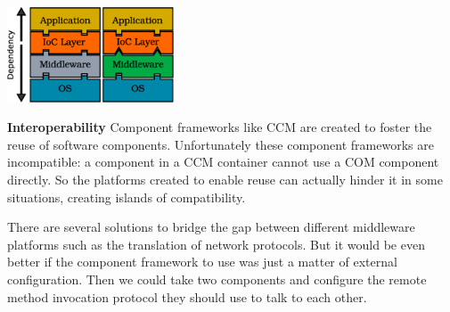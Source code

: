 \begin{center}
\includegraphics[height=80pt]{graphics_tables/good_layers.eps} 
\end{center}


\textbf{Interoperability} Component frameworks like CCM are created to foster the reuse of software components.
Unfortunately these component frameworks are incompatible: a component in a CCM container cannot use a COM
component directly. So the platforms created to enable reuse can actually hinder it in some situations, creating
islands of compatibility. 

There are several solutions to bridge the gap between different middleware platforms such as the translation of
network protocols. But it would be even better if the component framework to use was just a matter of external
configuration. Then we could take two components and configure the remote method invocation protocol they should
use to talk to each other.
